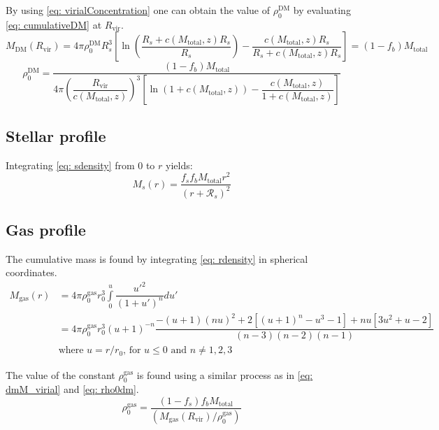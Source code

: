 		By using \autoref{eq: virialConcentration} one can obtain the value of $\rho_0^\text{DM}$ by evaluating \autoref{eq: cumulativeDM} at $R_\text{vir}$.
		\begin{equation}\label{eq: dmM_virial}
		M_\text{DM}(R_\text{vir}) = 4\pi\rho_0^\text{DM}R_s^3 \left[\ln\left(\dfrac{R_s + c(M_\text{total}, z)R_s}{R_s}\right) - \dfrac{c(M_\text{total}, z)R_s}{R_s + c(M_\text{total}, z)R_s}\right] = (1 - f_b)M_\text{total}
		\end{equation}
		\begin{equation}\label{eq: rho0dm}
		\rho_0^\text{DM} = \dfrac{(1 - f_b)M_\text{total}}{4\pi \left(\dfrac{R_\text{vir}}{c(M_\text{total}, z)}\right)^3 \left[\ln\left(1 + c(M_\text{total}, z)\right) - \dfrac{c(M_\text{total}, z)}{1 + c(M_\text{total}, z)}\right]}
		\end{equation}
	
	\subsection{Stellar profile}		
		Integrating \autoref{eq: sdensity} from $0$ to $r$ yields:
		\begin{equation}
			M_s(r) = \dfrac{f_sf_bM_\text{total} r^2}{(r + \mathcal{R}_s)^2}
		\end{equation}
	
	\subsection{Gas profile}		
		The cumulative mass is found by integrating \autoref{eq: rdensity} in spherical coordinates.
		\begin{equation}
			\begin{array}{rl}
			M_\text{gas}(r) 
			& = 4\pi\rho_0^\text{gas} r_0^3\int\limits_{0}^{u}\dfrac{u'^2}{(1 + u')^n}du' \\
			& = 4\pi\rho_0^\text{gas} r_0^3\left(u + 1\right)^{-n}\dfrac{-(u + 1)(nu)^2 + 2[(u + 1)^n - u^3-1] + nu[3u^2 + u - 2]}{(n - 3)(n - 2)(n - 1)}
			\\
			& \text{where $u = r/r_0$, for $u \leq 0$ and $n \neq {1, 2, 3}$}
			\end{array}
		\end{equation}
		
		The value of the constant $\rho_0^\text{gas}$ is found using a similar process as in \autoref{eq: dmM_virial} and \ref{eq: rho0dm}.
		\begin{equation}
			\rho_0^\text{gas} = \dfrac{(1 - f_s) f_bM_\text{total}}{(M_\text{gas}(R_\text{vir}) / \rho_0^\text{gas})}
		\end{equation}
		
